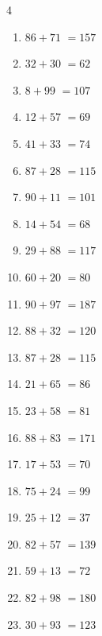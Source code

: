 \begin{multicols}{4}
\begin{enumerate}
  \item $86+71$
        $=157$

  \item $32+30$
        $=62$

  \item $8+99$
        $=107$

  \item $12+57$
        $=69$

  \item $41+33$
        $=74$

  \item $87+28$
        $=115$

  \item $90+11$
        $=101$

  \item $14+54$
        $=68$

  \item $29+88$
        $=117$

  \item $60+20$
        $=80$

  \item $90+97$
        $=187$

  \item $88+32$
        $=120$

  \item $87+28$
        $=115$

  \item $21+65$
        $=86$

  \item $23+58$
        $=81$

\columnbreak %

  \item $88+83$
        $=171$

  \item $17+53$
        $=70$

  \item $75+24$
        $=99$

  \item $25+12$
        $=37$

  \item $82+57$
        $=139$

  \item $59+13$
        $=72$

  \item $82+98$
        $=180$

  \item $30+93$
        $=123$


\end{enumerate}
\end{multicols}

